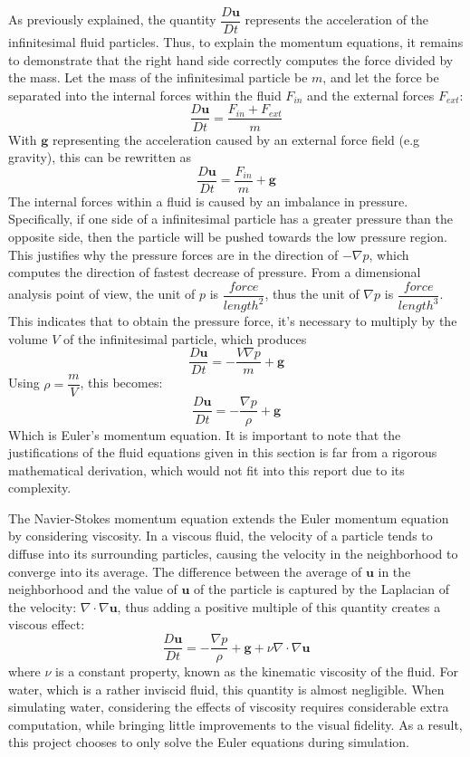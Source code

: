As previously explained, the quantity $\dfrac{D\textbf{u}}{Dt}$ represents the acceleration of the infinitesimal fluid particles. Thus, to explain the momentum equations, it remains to demonstrate that the right hand side correctly computes the force divided by the mass. Let the mass of the infinitesimal particle be $m$, and let the force be separated into the internal forces within the fluid $F_{in}$ and the external forces $F_{ext}$:
$$
\dfrac{D\textbf{u}}{Dt} = \frac{F_{in} + F_{ext}}{m}
$$
With $\textbf{g}$ representing the acceleration caused by an external force field (e.g gravity), this can be rewritten as
$$
\dfrac{D\textbf{u}}{Dt} = \frac{F_{in}}{m} + \textbf{g}
$$
The internal forces within a fluid is caused by an imbalance in pressure. Specifically, if one side of a infinitesimal particle has a greater pressure than the opposite side, then the particle will be pushed towards the low pressure region. This justifies why the pressure forces are in the direction of $-\nabla p$, which computes the direction of fastest decrease of pressure. From a dimensional analysis point of view, the unit of $p$ is $\dfrac{force}{length^2}$, thus the unit of $\nabla p$ is $\dfrac{force}{length^3}$. This indicates that to obtain the pressure force, it's necessary to multiply by the volume $V$ of the infinitesimal particle, which produces
$$
\dfrac{D\textbf{u}}{Dt} = -\frac{V \nabla p}{m} + \textbf{g}
$$
Using $\rho = \dfrac{m}{V}$, this becomes:
$$
\dfrac{D\textbf{u}}{Dt} =  -\frac{\nabla p}{\rho} + \textbf{g}
$$
Which is Euler's momentum equation. It is important to note that the justifications of the fluid equations given in this section is far from a rigorous mathematical derivation, which would not fit into this report due to its complexity. 


The Navier-Stokes momentum equation extends the Euler momentum equation by considering viscosity. In a viscous fluid, the velocity of a particle tends to diffuse into its surrounding particles, causing the velocity in the neighborhood to converge into its average. The difference between the average of $\textbf{u}$ in the neighborhood and the value of $\textbf{u}$ of the particle is captured by the Laplacian of the velocity: $\nabla \cdot \nabla \textbf{u}$, thus adding a positive multiple of this quantity creates a viscous effect:
$$
\frac{D\textbf{u}}{Dt}   =   -\frac{\nabla p}{\rho} + \textbf{g} + \nu \nabla \cdot \nabla \textbf{u} 
$$
where $\nu$ is a constant property, known as the kinematic viscosity of the fluid. For water, which is a rather inviscid fluid, this quantity is almost negligible. When simulating water, considering the effects of viscosity requires considerable extra computation, while bringing little improvements to the visual fidelity. As a result, this project chooses to only solve the Euler equations during simulation. 


